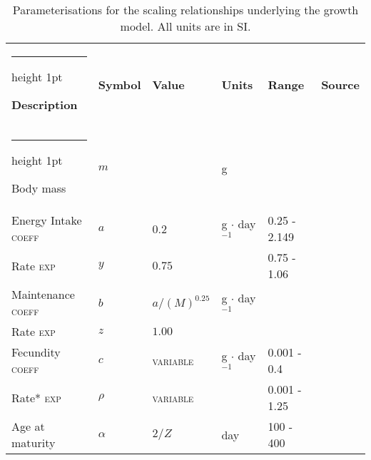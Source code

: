\documentclass[a4paper]{article} %
\makeatletter
\newcommand{\thickhline}{%
    \noalign {\ifnum 0=`}\fi \hrule height 1pt
    \futurelet \reserved@a \@xhline
}
\makeatother
\begin{document}
\begin{table}[h]
    \caption{Parameterisations for the scaling relationships underlying the growth model. All units are in SI.}
    \begin{tabularx}{\linewidth}{Xlllll}
    \thickhline
    \textbf{Description}                                    & \textbf{Symbol}       & \textbf{Value}            & \textbf{Units}        & \textbf{Range}                    & \textbf{Source}       \\ \thickhline
    Body mass                                               & $m$                   &                           & g                     &                                   &                       \\ \hline
    Energy Intake  \quad      \textsc{coeff}                & $a$                   & 0.2                       & g $\cdot$ day$^{-1}$  & 0.25 - 2.149                      & \textcite{West2001}       \\ 
    Rate           \quad\quad\quad\quad      \textsc{exp}   & $y$                   & $0.75$                    & \textsc{}             & 0.75 - 1.06                       & \textcite{Pawar2012}      \\ \hline
    Maintenance    \quad \textsc{coeff}                     & $b$                   & $a/(M)^{0.25}$            & g $\cdot$ day$^{-1}$  &                                   & \textcite{West2001}       \\ 
    Rate           \quad\quad\quad\quad    \textsc{exp}     & $z$                   & $1.00$                    & \textsc{}             &                                   &                       \\ \hline
    Fecundity   \quad\textsc{coeff}                         & $c$                   & \textsc{variable}         & g $\cdot$ day$^{-1}$  & 0.001 - 0.4                       & \textcite{Charnov2001}    \\  %
    Rate*       \quad\quad\quad\quad       \textsc{exp}     & $\rho$                & \textsc{variable}         & \textsc{}             & 0.001 - 1.25                      & \textcite{Barneche2018-reproductive_output}                      \\ \hline %
    Age at maturity                                         & $\alpha$              & $2/Z$                     & day                   & 100 - 400                         &                       \\ \hline

\end{tabularx}
\end{table}
\end{document}
